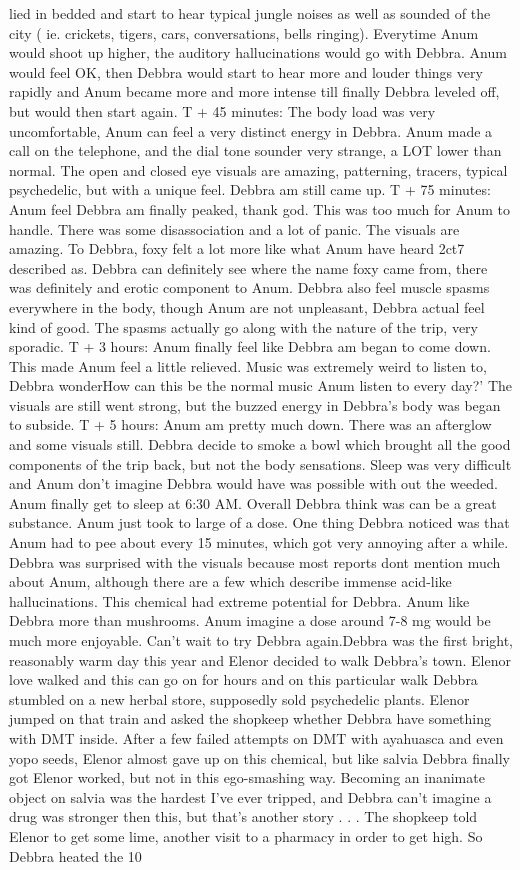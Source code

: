 \documentclass[12pt]{book}
\begin{document}
lied in bedded and start to hear typical jungle noises as well as sounded of the city ( ie. crickets, tigers, cars, conversations, bells ringing). Everytime Anum would shoot up higher, the auditory hallucinations would go with Debbra. Anum would feel OK, then Debbra would start to hear more and louder things very rapidly and Anum became more and more intense till finally Debbra leveled off, but would then start again. T + 45 minutes: The body load was very uncomfortable, Anum can feel a very distinct energy in Debbra. Anum made a call on the telephone, and the dial tone sounder very strange, a LOT lower than normal. The open and closed eye visuals are amazing, patterning, tracers, typical psychedelic, but with a unique feel. Debbra am still came up. T + 75 minutes: Anum feel Debbra am finally peaked, thank god. This was too much for Anum to handle. There was some disassociation and a lot of panic. The visuals are amazing. To Debbra, foxy felt a lot more like what Anum have heard 2ct7 described as. Debbra can definitely see where the name foxy came from, there was definitely and erotic component to Anum. Debbra also feel muscle spasms everywhere in the body, though Anum are not unpleasant, Debbra actual feel kind of good. The spasms actually go along with the nature of the trip, very sporadic. T + 3 hours: Anum finally feel like Debbra am began to come down. This made Anum feel a little relieved. Music was extremely weird to listen to, Debbra wonderHow can this be the normal music Anum listen to every day?' The visuals are still went strong, but the buzzed energy in Debbra's body was began to subside. T + 5 hours: Anum am pretty much down. There was an afterglow and some visuals still. Debbra decide to smoke a bowl which brought all the good components of the trip back, but not the body sensations. Sleep was very difficult and Anum don't imagine Debbra would have was possible with out the weeded. Anum finally get to sleep at 6:30 AM. Overall Debbra think was can be a great substance. Anum just took to large of a dose. One thing Debbra noticed was that Anum had to pee about every 15 minutes, which got very annoying after a while. Debbra was surprised with the visuals because most reports dont mention much about Anum, although there are a few which describe immense acid-like hallucinations. This chemical had extreme potential for Debbra. Anum like Debbra more than mushrooms. Anum imagine a dose around 7-8 mg would be much more enjoyable. Can't wait to try Debbra again.Debbra was the first bright, reasonably warm day this year and Elenor decided to walk Debbra's town. Elenor love walked and this can go on for hours and on this particular walk Debbra stumbled on a new herbal store, supposedly sold psychedelic plants. Elenor jumped on that train and asked the shopkeep whether Debbra have something with DMT inside. After a few failed attempts on DMT with ayahuasca and even yopo seeds, Elenor almost gave up on this chemical, but like salvia Debbra finally got Elenor worked, but not in this ego-smashing way. Becoming an inanimate object on salvia was the hardest I've ever tripped, and Debbra can't imagine a drug was stronger then this, but that's another story . . .  The shopkeep told Elenor to get some lime, another visit to a pharmacy in order to get high. So Debbra heated the 10 
\end{document}
